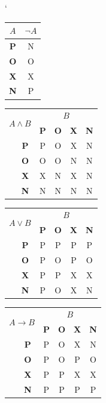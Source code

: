 \documentclass[a4paper,11pt]{article}
\begin{document}
	\begin{table}[ht]
		\catcode`	
		\begin{center}
			\begin{tabular}{|c|c|} 
				\hline
				$A$ & $\neg A$\\
				\hline
				
				\textbf{P} & N \\ 
				\textbf{O} & O \\ 
				\textbf{X} & X \\ 
				\textbf{N} & P \\
				
				\hline
			\end{tabular}
			\begin{tabular}{|c|c|c|c|c|c|}
				\hline
				
				\multicolumn{2}{|c|}{\multirow{2}{*}{$A \land B$}}&\multicolumn{4}{c|}{$B$}\\ \cline{3-6}
				\multicolumn{2}{|c|}{}&\textbf{P} & \textbf{O} & \textbf{X} & \textbf{N}\\ \hline
				{\multirow{4}{*}{$A$}}
				& \textbf{P} & P & O & X & N\\ \cline{2-6}
				& \textbf{O} & O & O & N & N\\ \cline{2-6}
				& \textbf{X} & X & N & X & N\\ \cline{2-6}
				& \textbf{N} & N & N & N & N\\ 
				
				\hline
			\end{tabular}
			\begin{tabular}{|c|c|c|c|c|c|}
				\hline
				
				\multicolumn{2}{|c|}{\multirow{2}{*}{$A \lor B$}}&\multicolumn{4}{c|}{$B$}\\ \cline{3-6}
				\multicolumn{2}{|c|}{}&\textbf{P} & \textbf{O} & \textbf{X} & \textbf{N}\\ \hline
				{\multirow{4}{*}{$A$}}& \textbf{P} & P & P & P & P\\\cline{2-6}
				& \textbf{O} & P & O & P & O\\ \cline{2-6}
				& \textbf{X} & P & P & X & X\\ \cline{2-6}
				& \textbf{N} & P & O & X & N\\ 
				
				\hline
			\end{tabular}
			\begin{tabular}{|c|c|c|c|c|c|}
				\hline
				
				\multicolumn{2}{|c|}{\multirow{2}{*}{$A \rightarrow B$}}&\multicolumn{4}{c|}{$B$}\\ \cline{3-6}
				\multicolumn{2}{|c|}{}&\textbf{P} & \textbf{O} & \textbf{X} & \textbf{N}\\ \hline
				{\multirow{4}{*}{$A$}}& \textbf{P} & P & O & X & N\\ \cline{2-6}
				& \textbf{O} & P & O & P & O\\ \cline{2-6}
				& \textbf{X} & P & P & X & X\\ \cline{2-6}
				& \textbf{N} & P & P & P & P\\
				\hline
			\end{tabular}
		

\end{center}
\end{table}
\end{document}

